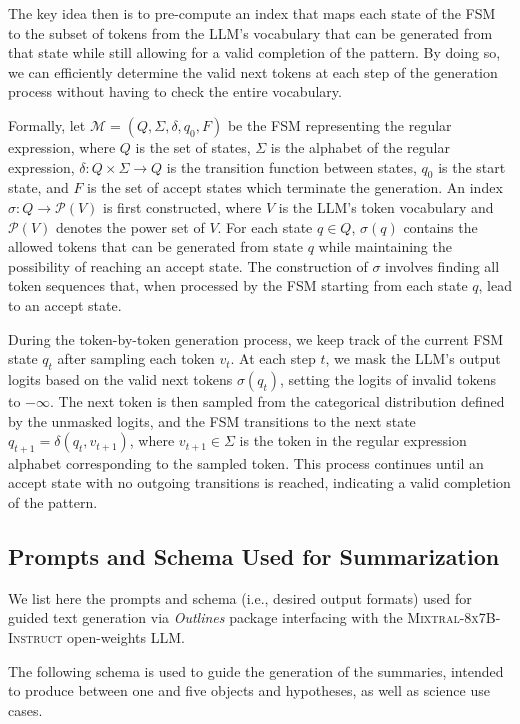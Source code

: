 \documentclass[10pt]{article} %
\newcommand{\package}[1]{\textsl{#1}\xspace}
\begin{document}
The key idea then is to pre-compute an index that maps each state of the FSM to the subset of tokens from the LLM's vocabulary that can be generated from that state while still allowing for a valid completion of the pattern. By doing so, we can efficiently determine the valid next tokens at each step of the generation process without having to check the entire vocabulary.

Formally, let $\mathcal{M} = (Q, \Sigma, \delta, q_0, F)$ be the FSM representing the regular expression, where $Q$ is the set of states, $\Sigma$ is the alphabet of the regular expression, $\delta: Q \times \Sigma \rightarrow Q$ is the transition function between states, $q_0$ is the start state, and $F$ is the set of accept states which terminate the generation. An index $\sigma: Q \rightarrow \mathcal{P}(V)$ is first constructed, where $V$ is the LLM's token vocabulary and $\mathcal{P}(V)$ denotes the power set of $V$. For each state $q \in Q$, $\sigma(q)$ contains the allowed tokens that can be generated from state $q$ while maintaining the possibility of reaching an accept state. The construction of $\sigma$ involves finding all token sequences that, when processed by the FSM starting from each state $q$, lead to an accept state.

During the token-by-token generation process, we keep track of the current FSM state $q_t$ after sampling each token $v_t$. At each step $t$, we mask the LLM's output logits based on the valid next tokens $\sigma(q_t)$, setting the logits of invalid tokens to $-\infty$. The next token is then sampled from the categorical distribution defined by the unmasked logits, and the FSM transitions to the next state $q_{t+1} = \delta(q_t, v_{t+1})$, where $v_{t+1} \in \Sigma$ is the token in the regular expression alphabet corresponding to the sampled token. This process continues until an accept state with no outgoing transitions is reached, indicating a valid completion of the pattern.

\subsection{Prompts and Schema Used for Summarization}
\label{app:summarization}

We list here the prompts and schema (i.e., desired output formats) used for guided text generation via \package{Outlines} package interfacing with the \textsc{Mixtral-8x7B-Instruct} open-weights LLM.

The following schema is used to guide the generation of the summaries, intended to produce between one and five objects and hypotheses, as well as science use cases. \\
\end{document}
